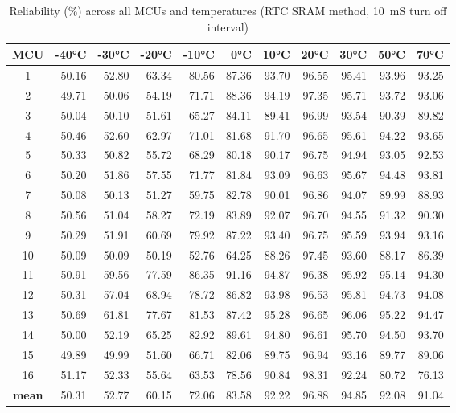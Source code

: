 \begin{table}[ht!]
    \centering
    \begin{tabular}{c||rrrrrrrrrr}
    \toprule
    \textbf{MCU} & \textbf{-40°C} & \textbf{-30°C} & \textbf{-20°C} & \textbf{-10°C} & \textbf{0°C} & \textbf{10°C} & \textbf{20°C} & \textbf{30°C} & \textbf{50°C} & \textbf{70°C} \\
    \midrule
    1    &  50.16 &  52.80 &  63.34 &  80.56 & 87.36 & 93.70 & 96.55 & 95.41 & 93.96 & 93.25 \\
    2    &  49.71 &  50.06 &  54.19 &  71.71 & 88.36 & 94.19 & 97.35 & 95.71 & 93.72 & 93.06 \\
    3    &  50.04 &  50.10 &  51.61 &  65.27 & 84.11 & 89.41 & 96.99 & 93.54 & 90.39 & 89.82 \\
    4    &  50.46 &  52.60 &  62.97 &  71.01 & 81.68 & 91.70 & 96.65 & 95.61 & 94.22 & 93.65 \\
    5    &  50.33 &  50.82 &  55.72 &  68.29 & 80.18 & 90.17 & 96.75 & 94.94 & 93.05 & 92.53 \\
    6    &  50.20 &  51.86 &  57.55 &  71.77 & 81.84 & 93.09 & 96.63 & 95.67 & 94.48 & 93.81 \\
    7    &  50.08 &  50.13 &  51.27 &  59.75 & 82.78 & 90.01 & 96.86 & 94.07 & 89.99 & 88.93 \\
    8    &  50.56 &  51.04 &  58.27 &  72.19 & 83.89 & 92.07 & 96.70 & 94.55 & 91.32 & 90.30 \\
    9    &  50.29 &  51.91 &  60.69 &  79.92 & 87.22 & 93.40 & 96.75 & 95.59 & 93.94 & 93.16 \\
    10   &  50.09 &  50.09 &  50.19 &  52.76 & 64.25 & 88.26 & 97.45 & 93.60 & 88.17 & 86.39 \\
    11   &  50.91 &  59.56 &  77.59 &  86.35 & 91.16 & 94.87 & 96.38 & 95.92 & 95.14 & 94.30 \\
    12   &  50.31 &  57.04 &  68.94 &  78.72 & 86.82 & 93.98 & 96.53 & 95.81 & 94.73 & 94.08 \\
    13   &  50.69 &  61.81 &  77.67 &  81.53 & 87.42 & 95.28 & 96.65 & 96.06 & 95.22 & 94.47 \\
    14   &  50.00 &  52.19 &  65.25 &  82.92 & 89.61 & 94.80 & 96.61 & 95.70 & 94.50 & 93.70 \\
    15   &  49.89 &  49.99 &  51.60 &  66.71 & 82.06 & 89.75 & 96.94 & 93.16 & 89.77 & 89.06 \\
    16   &  51.17 &  52.33 &  55.64 &  63.53 & 78.56 & 90.84 & 98.31 & 92.24 & 80.72 & 76.13 \\
    \textbf{mean} &  50.31 &  52.77 &  60.15 &  72.06 & 83.58 & 92.22 & 96.88 & 94.85 & 92.08 & 91.04 \\
    \bottomrule
    \end{tabular}
    \captionsetup{justification=centering,margin=0.5cm}
    \caption{Reliability (\%) across all MCUs and temperatures (RTC SRAM method, 10~mS turn off interval)}
    \label{table:reliability_rtc_sram}
\end{table}

